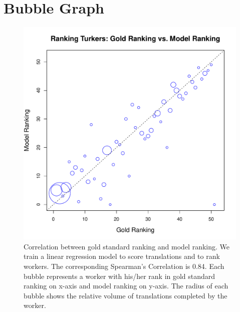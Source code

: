 \documentclass[11pt,letterpaper]{article}
\begin{document}
 \section{Bubble Graph}
 \begin{figure}[h!]
  \centering
  \includegraphics[width=\linewidth]{AllFeatureWithCali/allfeaturelinear.pdf}
  \caption{ Correlation between gold standard ranking and model ranking. We train a linear regression model to score translations and to rank workers. The corresponding Spearman’s Correlation is 0.84. Each bubble represents a worker with his/her rank in gold standard ranking on x-axis and model ranking on y-axis. The radius of each bubble shows the relative volume of translations completed by the worker.}
    \label{firstksenbleu}
\end{figure}

\end{document}
